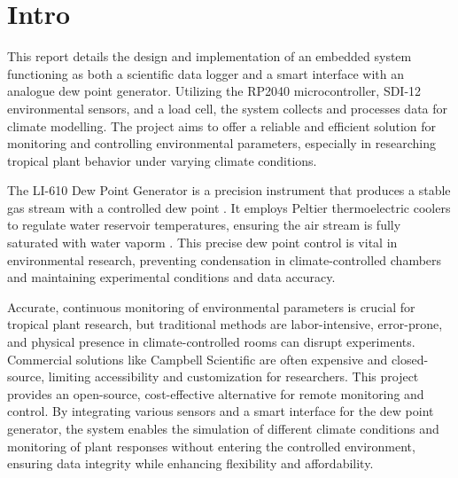 \section{Intro}

This report details the design and implementation of an embedded system functioning as both a scientific data logger and a smart interface with an analogue dew point generator. Utilizing the RP2040 microcontroller, SDI-12 environmental sensors, and a load cell, the system collects and processes data for climate modelling. The project aims to offer a reliable and efficient solution for monitoring and controlling environmental parameters, especially in researching tropical plant behavior under varying climate conditions.

The LI-610 Dew Point Generator is a precision instrument that produces a stable gas stream with a controlled dew point \cite{LICORDocument}. It employs Peltier thermoelectric coolers to regulate water reservoir temperatures, ensuring the air stream is fully saturated with water vaporm \cite{LICORDocument}. This precise dew point control is vital in environmental research, preventing condensation in climate-controlled chambers and maintaining experimental conditions and data accuracy.

Accurate, continuous monitoring of environmental parameters is crucial for tropical plant research, but traditional methods are labor-intensive, error-prone, and physical presence in climate-controlled rooms can disrupt experiments. Commercial solutions like Campbell Scientific are often expensive and closed-source, limiting accessibility and customization for researchers. This project provides an open-source, cost-effective alternative for remote monitoring and control. By integrating various sensors and a smart interface for the dew point generator, the system enables the simulation of different climate conditions and monitoring of plant responses without entering the controlled environment, ensuring data integrity while enhancing flexibility and affordability.